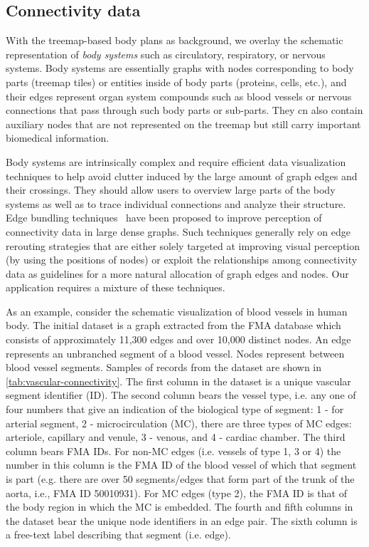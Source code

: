 \subsection{Connectivity data} %

With the treemap-based body plans as background, we overlay the schematic representation of \emph{body systems} such as circulatory, respiratory, or nervous systems. Body systems are essentially graphs with nodes corresponding to body parts (treemap tiles) or entities inside of body parts (proteins, cells, etc.), and their edges represent organ system compounds such as blood vessels or nervous connections that pass through such body parts or sub-parts.
They cn also contain auxiliary nodes that are not represented on the treemap but still carry important biomedical information. 

Body systems are intrinsically complex and require efficient data visualization techniques to help avoid clutter induced by the large amount of graph edges and their crossings. They should allow users to overview large parts of the body systems as well as to trace individual connections and analyze their structure. Edge bundling techniques~\cite{Hol06,GHN+11,HET12} have been proposed to improve perception of connectivity data in large dense graphs.
Such techniques generally rely on edge rerouting strategies that are either solely targeted at improving visual perception (by using the positions of nodes) or exploit the relationships among connectivity data as guidelines for a more natural allocation of graph edges and nodes. Our application requires a mixture of these techniques.

As an example, consider the schematic visualization of blood vessels in human body.
The initial dataset is a graph extracted from the FMA database which consists of approximately 11,300 edges and over 10,000 distinct nodes.
An edge represents an unbranched segment of a blood vessel. Nodes represent  between blood vessel segments.
Samples of records from the dataset are shown in \cref{tab:vascular-connectivity}. The first column in the dataset is a unique vascular segment identifier (ID). The second column bears the vessel type, i.e. any one of four numbers that give  an indication of the biological type of segment:
1 - for arterial segment, 2 - microcirculation (MC), there are three types of MC edges: arteriole, capillary and venule, 3 - venous, and 4 - cardiac chamber.
The third column bears FMA IDs. For non-MC edges (i.e. vessels of type 1, 3 or 4) the number in this column is the FMA ID of the blood vessel of
which that segment is part (e.g. there are over 50 segments/edges that form part of the trunk of the aorta, i.e., FMA ID 50010931). For MC edges (type 2), the FMA ID is that of the body region in which the MC is embedded. The fourth and fifth columns in the dataset bear the unique node identifiers in an edge pair.
The sixth column is a free-text label describing that segment (i.e. edge).


